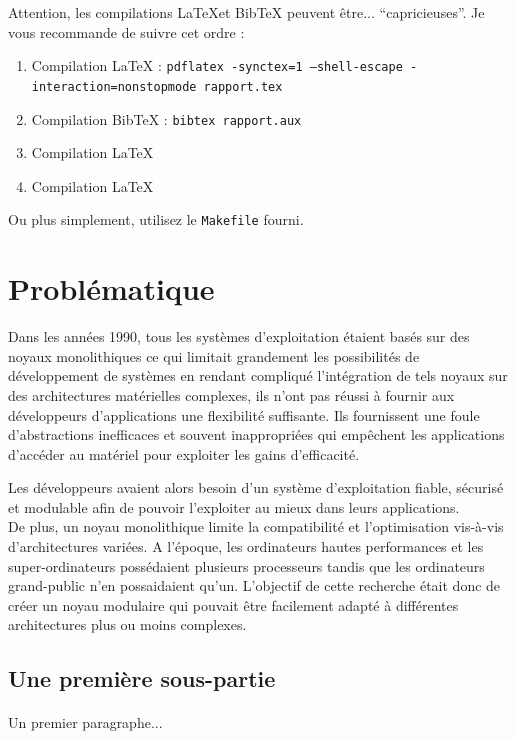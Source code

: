 \documentclass[a4paper, 12pt]{article}
\begin{document}
Attention, les compilations \LaTeX et BibTeX peuvent être... ``capricieuses''. Je vous recommande de suivre cet ordre :
\begin{enumerate}
\item Compilation \LaTeX{} : \texttt{pdflatex -synctex=1 --shell-escape -interaction=nonstopmode rapport.tex}
\item Compilation BibTeX : \texttt{bibtex rapport.aux}
\item Compilation \LaTeX{}
\item Compilation \LaTeX{}
\end{enumerate}
Ou plus simplement, utilisez le \texttt{Makefile} fourni.

\clearpage 
\section{Problématique}

Dans les années 1990, tous les systèmes d'exploitation étaient basés sur des noyaux monolithiques ce qui limitait grandement les possibilités de développement de systèmes en rendant compliqué l'intégration de tels noyaux sur des architectures matérielles complexes, ils n'ont pas réussi à fournir aux développeurs d'applications une flexibilité suffisante. Ils fournissent une foule d'abstractions inefficaces et souvent inappropriées qui empêchent les applications d'accéder au matériel pour exploiter les gains d'efficacité.\newline

Les développeurs avaient alors besoin d'un système d'exploitation fiable, sécurisé et modulable afin de pouvoir l'exploiter au mieux dans leurs applications. \\
De plus, un noyau monolithique limite la compatibilité et l'optimisation vis-à-vis d'architectures variées. A l'époque, les ordinateurs hautes performances et les super-ordinateurs possédaient plusieurs processeurs tandis que les ordinateurs grand-public n'en possaidaient qu'un. L'objectif de cette recherche était donc de créer un noyau modulaire qui pouvait être facilement adapté à différentes architectures plus ou moins complexes.


\subsection{Une première sous-partie}
\paragraph{}
Un premier paragraphe...
\end{document}
